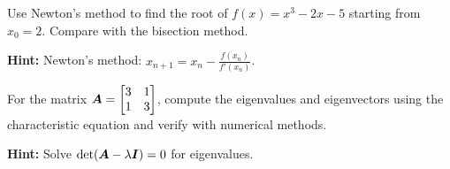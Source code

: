 \begin{problem}
\label{prob:newton-method}
Use Newton's method to find the root of $f(x) = x^3 - 2x - 5$ starting from $x_0 = 2$. Compare with the bisection method.

\textbf{Hint:} Newton's method: $x_{n+1} = x_n - \frac{f(x_n)}{f'(x_n)}$.
\end{problem}

\begin{problem}
\label{prob:eigenvalue-computation}
For the matrix $\boldsymbol{A} = \begin{bmatrix} 3 & 1 \\ 1 & 3 \end{bmatrix}$, compute the eigenvalues and eigenvectors using the characteristic equation and verify with numerical methods.

\textbf{Hint:} Solve $\det(\boldsymbol{A} - \lambda\boldsymbol{I}) = 0$ for eigenvalues.
\end{problem}
